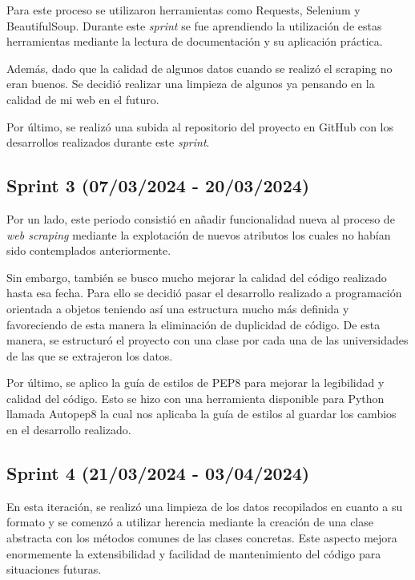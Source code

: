 Para este proceso se utilizaron herramientas como Requests, Selenium y BeautifulSoup. Durante este \textit{sprint} se fue aprendiendo la utilización de estas herramientas mediante la lectura de documentación y su aplicación práctica.

Además, dado que la calidad de algunos datos cuando se realizó el scraping no eran buenos. Se decidió realizar una limpieza de algunos ya pensando en la calidad de mi web en el futuro.

Por último, se realizó una subida al repositorio del proyecto en GitHub con los desarrollos realizados durante este \textit{sprint}.


\subsection{Sprint 3 (07/03/2024 -
20/03/2024)}
Por un lado, este periodo consistió en añadir funcionalidad nueva al proceso de \textit{web scraping} mediante la explotación de nuevos atributos los cuales no habían sido contemplados anteriormente.

Sin embargo, también se busco mucho mejorar la calidad del código realizado hasta esa fecha. Para ello se decidió pasar el desarrollo realizado a programación orientada a objetos teniendo así una estructura mucho más definida y favoreciendo de esta manera la eliminación de duplicidad de código. De esta manera, se estructuró el proyecto con una clase por cada una de las universidades de las que se extrajeron los datos.

Por último, se aplico la guía de estilos de PEP8 para mejorar la legibilidad y calidad del código. Esto se hizo con una herramienta disponible para Python llamada Autopep8 la cual nos aplicaba la guía de estilos al guardar los cambios en el desarrollo realizado.


\subsection{Sprint 4 (21/03/2024 -
03/04/2024)}
En esta iteración, se realizó una limpieza de los datos recopilados en cuanto a su formato y se comenzó a utilizar herencia mediante la creación de una clase abstracta con los métodos comunes de las clases concretas. Este aspecto mejora enormemente la extensibilidad y facilidad de mantenimiento del código para situaciones futuras.

